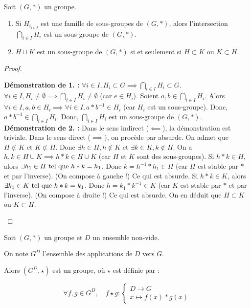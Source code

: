 \documentclass[12pt, a4paper]{report}
\begin{document}
\begin{property}
    Soit $(G,*)$ un groupe.
    \begin{enumerate}
        \item Si $H_{i_{i\in I}}$ est une famille de sous-groupes de $(G,*)$, alors l'intersection $\bigcap_{i\in I} H_i$ est un sous-groupe de $(G,*)$.
        \item $H \cup K$ est un sous-groupe de $(G,*)$ si et seulement si $H \subset K$ ou $K \subset H$.
    \end{enumerate}
\end{property}

\begin{proof}
    \begin{outline}
        \1 \textbf{Démonstration de 1. :}
        \2 $\forall i \in I, H_i \subset G \implies \bigcap_{i\in I} H_i \subset G$.
        \2 $\forall i \in I, H_i \ne \emptyset \implies \bigcap_{i\in I} H_i \ne \emptyset$ (car $e \in H_i$).
        \2 Soient $a,b \in \bigcap_{i\in I} H_i$.
        \2 Alors $\forall i \in I, a,b \in H_i \implies \forall i \in I, a*b^{-1} \in H_i$ (car $H_i$ est un sous-groupe).
        \2 Donc, $a*b^{-1} \in \bigcap_{i\in I} H_i$.
        \2 Donc, $\bigcap_{i\in I} H_i$ est un sous-groupe de $(G,*)$.
        \1 \textbf{Démonstration de 2. :}
        \2 Dans le sens indirect ($\impliedby$), la démonstration est triviale.
        \2 Dans le sens direct ($\implies$), on procède par absurde. On admet que $H \not\subset K$ et $K \not\subset H$.
        \2 Donc $\exists h \in H, h \notin K$ et $\exists k \in K, k \notin H$.
        \2 On a $h,k\in H\cup K \implies h*k \in H \cup K$ (car $H$ et $K$ sont des sous-groupes).
        \2 Si $h*k \in H$, alors $\exists h_1 \in H \text{ tel que } h*k = h_1$.
        \3 Donc $k=h^{-1}*h_1 \in H$ (car $H$ est stable par $*$ et par l'inverse). (On compose à gauche !)
        \3 Ce qui est absurde.
        \2 Si $h*k \in K$, alors $\exists k_1 \in K \text{ tel que } h*k = k_1$.
        \3 Donc $h = k_1 * k^{-1} \in K$ (car $K$ est stable par $*$ et par l'inverse). (On compose à droite !)
        \3 Ce qui est absurde.
        \2 On en déduit que $H \subset K$ ou $K \subset H$.
    \end{outline}
\end{proof}

\begin{property}
    Soit $(G,*)$ un groupe et $D$ un ensemble non-vide.

    On note $G^D$ l'ensemble des applications de $D$ vers $G$.

    Alors $(G^D, \star)$ est un groupe, où $\star$ est définie par :

    $$\forall f,g \in G^D, \quad f \star g : \begin{cases}D \to G\\x \mapsto f(x) * g(x)\end{cases}$$
\end{property}
\label{prop:G^D_groupe}
\end{document}
